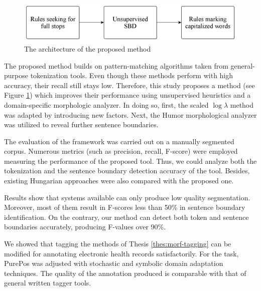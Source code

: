 \begin{figure}[H]
  \centering
  \includegraphics[scale=0.2]{Clinical/clin_segm_arch.png} 
  \caption{The architecture of the proposed method}
  \label{fig:clin-segment-arch_en}
\end{figure}

The proposed method builds on pattern-matching algorithms taken from general-purpose tokenization tools.
Even though these methods perform with high accuracy, their recall still stays low.
Therefore, this study proposes a method (see Figure \ref{fig:clin-segment-arch_en}) which improves their performance using unsupervised heuristics and a domain-specific morphologic analyzer.
In doing so, first, the scaled $\log\lambda$  method \cite{kiss2006unsupervised} was adapted by introducing new factors.
Next, the Humor morphological analyzer was utilized to reveal further sentence boundaries.

The evaluation of the framework was carried out on a manually segmented corpus. 
Numerous metrics (such as precision, recall, F-score) were employed measuring the performance of the proposed tool.
Thus, we could analyze both the tokenization and the sentence boundary detection accuracy of the tool.
Besides, existing Hungarian approaches were also compared with the proposed one.

Results show that systems available can only produce low quality segmentation.
Moreover, most of them result in F-scores less than 50\% in sentence boundary identification.
On the contrary, our method can detect both token and sentence boundaries accurately, producing F-values over 90\%.


\thesisline%

\begin{core}
\begin{thesis}%
\label{thes:clin-pos}
We showed that tagging the methods of Thesis \ref{thes:morf-tagging} can be modified for annotating electronic health records satisfactorily.
For the task, PurePos was adjusted with stochastic and symbolic domain adaptation techniques.
The quality of the annotation produced is comparable with that of general written tagger tools.
\end{thesis}

\begin{pub}
\cite{Orosz2013,Orosz2014b} 
\end{pub}
\end{core}

